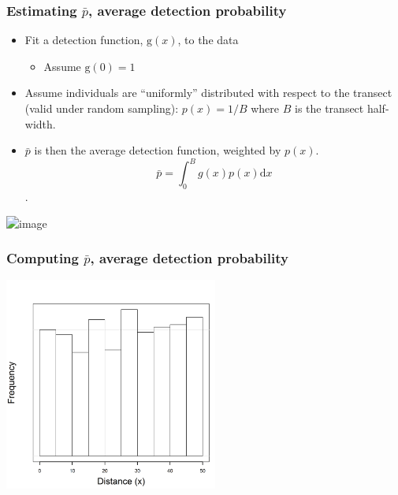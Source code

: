 \documentclass[color=usenames,dvipsnames]{beamer}\usepackage[]{graphicx}\usepackage[]{color}
\begin{document}
\begin{frame}
  \frametitle{Estimating $\bar{p}$, average detection probability}
  \begin{itemize}
    \normalsize
    \item<1-> Fit a detection function, $\mathrm{g}(x)$, to the data
      \begin{itemize}
        \item Assume $\mathrm{g}(0) = 1$
      \end{itemize}
    \item<2-> Assume individuals are ``uniformly'' distributed with
      respect to the transect (valid under random sampling): $p(x) =
      1/B$ where $B$ is the transect half-width.
    \item<3-> $\bar{p}$ is then the
      average detection function, weighted by $p(x)$. $$\bar{p} =
      \int_0^B g(x)p(x) \mathrm{d} x$$.  
    \end{itemize}
    \includegraphics<1->[width=\textwidth]{figs/detfuns}
\end{frame}






\begin{frame}
  \frametitle{Computing $\bar{p}$, average detection probability}
\begin{center}
  \includegraphics[width=7cm]{figs/detfun0-0}
\end{center}
\end{frame}
\end{document}

